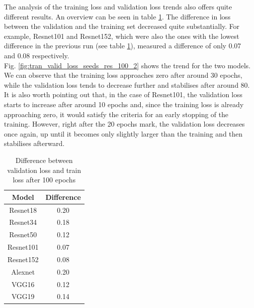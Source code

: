 The analysis of the training loss and validation loss trends also offers quite different results. An overview can be seen in table \ref{tab:difference_val_tra_loss_2}. The difference in loss between the validation and the training set decreased quite substantially. For example, Resnet101 and Resnet152, which were also the ones with the lowest difference in the previous run (see table \ref{tab:difference_val_tra_loss_2}), measured a difference of only 0.07 and 0.08 respectively. \\
Fig. \ref{fig:tran_valid_loss_seeds_res_100_2} shows the trend for the two models. We can observe that the training loss approaches zero after around 30 epochs, while the validation loss tends to decrease further and stabilises after around 80. It is also worth pointing out that, in the case of Resnet101, the validation loss starts to increase after around 10 epochs and, since the training loss is already approaching zero, it would satisfy the criteria for an early stopping of the training. However, right after the 20 epochs mark, the validation loss decreases once again, up until it becomes only slightly larger than the training and then stabilises afterward. 

\begin{table}[h]
\centering
        \begin{tabular}{ c c  }
                 Model&Difference\\
                 \hline
                   Resnet18&0.20\\
Resnet34&0.18\\
Resnet50&0.12\\
Resnet101&0.07\\
Resnet152&0.08\\
Alexnet&0.20\\
VGG16&0.12\\
VGG19&0.14\\
                    \end{tabular}
                    \caption{Difference between validation loss and train loss after 100 epochs }                   
                     \label{tab:difference_val_tra_loss_2}
     \end{table} 
     
